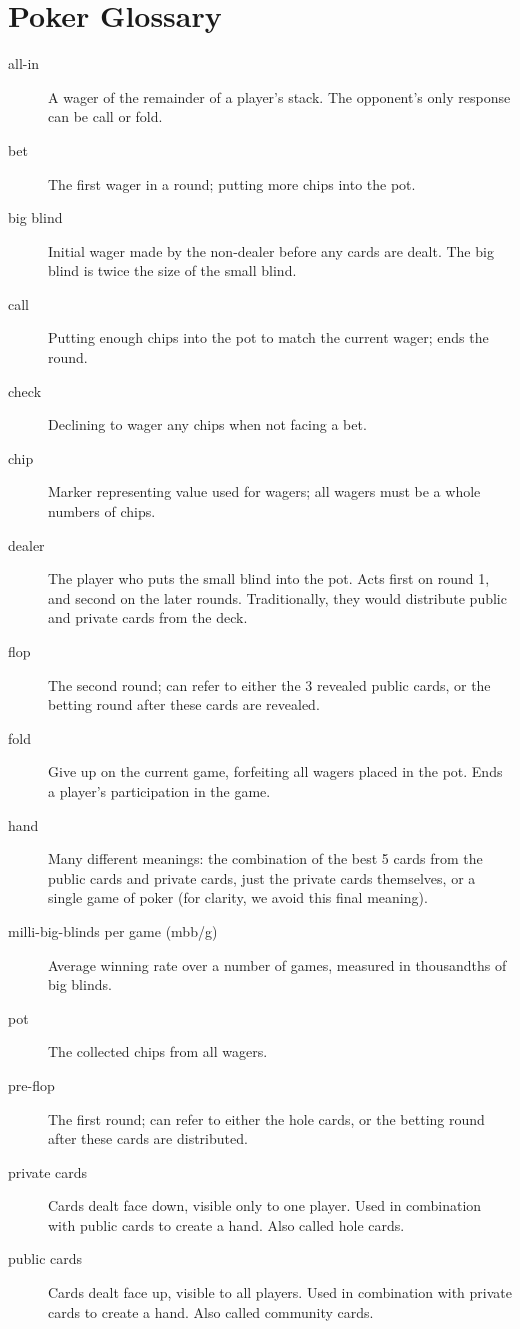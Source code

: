 \section*{Poker Glossary}
\begin{description}
\item[all-in] A wager of the remainder of a player's stack.  The opponent's only response can be call or fold.
\item[bet] The first wager in a round; putting more chips into the pot. 
\item[big blind] Initial wager made by the non-dealer before any cards are dealt.  The big blind is twice the size of the small blind.  
\item[call] Putting enough chips into the pot to match the current wager; ends the round.
\item[check] Declining to wager any chips when not facing a bet.
\item[chip] Marker representing value used for wagers; all wagers must be a whole numbers of chips.
\item[dealer] The player who puts the small blind into the pot.  Acts first on round 1, and second on the later rounds.  Traditionally, they would 
distribute public and private cards from the deck.  
\item[flop] The second round; can refer to either the 3 revealed public cards, or the betting round after these cards are revealed.
\item[fold] Give up on the current game, forfeiting all wagers placed in the pot.  Ends a player's participation in the game.
\item[hand] Many different meanings: the combination of the best 5 cards from the public cards and private cards, just the private cards themselves, or a single game of poker (for clarity, we avoid this final meaning). 
\item[milli-big-blinds per game (mbb/g)] Average winning rate over a number of games, measured in thousandths of big blinds.
\item[pot] The collected chips from all wagers.
\item[pre-flop] The first round; can refer to either the hole cards, or the betting round after these cards are distributed.
\item[private cards] Cards dealt face down, visible only to one player.  Used in combination with public cards to create a hand. Also called hole cards.
\item[public cards] Cards dealt face up, visible to all players.  Used in combination with private cards to create a hand. Also called community cards.

\end{description}
